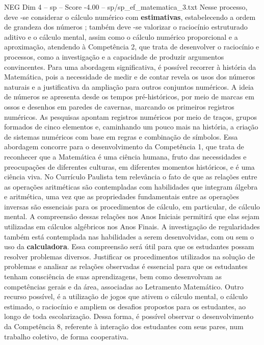 \begin{textsample}{NEG Dim 4 – sp – Score -4.00 – sp/sp\_ef\_matematica\_3.txt}
Nesse processo, deve -se considerar o cálculo numérico com \textbf{estimativas}, estabelecendo a ordem de grandeza dos números ; também deve -se valorizar o raciocínio estruturado aditivo e o cálculo mental, assim como o cálculo numérico proporcional e a aproximação, atendendo à Competência 2, que trata de desenvolver o raciocínio e processos, como a investigação e a capacidade de produzir argumentos convincentes.
Para uma abordagem significativa, é possível recorrer à história da Matemática, pois a necessidade de medir e de contar revela os usos dos números naturais e a justificativa da ampliação para outros conjuntos numéricos.
A ideia de números se apresenta desde os tempos pré-históricos, por meio de marcas em ossos e desenhos em paredes de cavernas, marcando os primeiros registros numéricos.
As pesquisas apontam registros numéricos por meio de traços, grupos formados de cinco elementos e, caminhando um pouco mais na história, a criação de sistemas numéricos com base em regras e combinação de símbolos.
Essa abordagem concorre para o desenvolvimento da Competência 1, que trata de reconhecer que a Matemática é uma ciência humana, fruto das necessidades e preocupações de diferentes culturas, em diferentes momentos históricos, e é uma ciência viva.
No Currículo Paulista tem relevância o fato de que as relações entre as operações aritméticas são contempladas com habilidades que integram álgebra e aritmética, uma vez que as propriedades fundamentais entre as operações inversas são essenciais para os procedimentos de cálculo, em particular, de cálculo mental.
A compreensão dessas relações nos Anos Iniciais permitirá que elas sejam utilizadas em cálculos algébricos nos Anos Finais.
A investigação de regularidades também está contemplada nas habilidades a serem desenvolvidas, com ou sem o uso da \textbf{calculadora}.
Essa compreensão será útil para que os estudantes possam resolver problemas diversos.
Justificar os procedimentos utilizados na solução de problemas e analisar as relações observadas é essencial para que os estudantes tenham consciência de suas aprendizagens, bem como desenvolvam as competências gerais e da área, associadas ao Letramento Matemático.
Outro recurso possível, é a utilização de jogos que ativem o cálculo mental, o cálculo estimado, o raciocínio e ampliem os desafios propostos para os estudantes, ao longo de toda escolarização.
Dessa forma, é possível observar o desenvolvimento da Competência 8, referente à interação dos estudantes com seus pares, num trabalho coletivo, de forma cooperativa.

\end{textsample}
